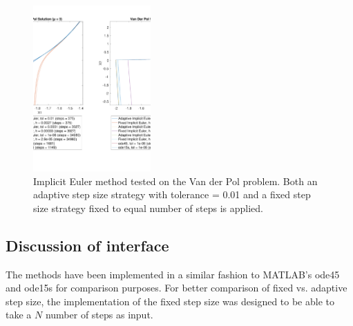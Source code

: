 \begin{figure}
    \centering
    \includegraphics[width=0.4\textwidth]{plots/3_4main_zoom.pdf}
    \caption{Implicit Euler method tested on the Van der Pol problem. Both an adaptive step size strategy with tolerance = 0.01 and a fixed step size strategy fixed to equal number of steps is applied.}
    \label{fig:2_4a}
\end{figure}




\subsection{Discussion of interface}
The methods have been implemented in a similar fashion to MATLAB's ode45 and ode15s for comparison purposes. For better comparison of fixed vs. adaptive step size, the implementation of the fixed step size was designed to be able to take a $N$ number of steps as input.